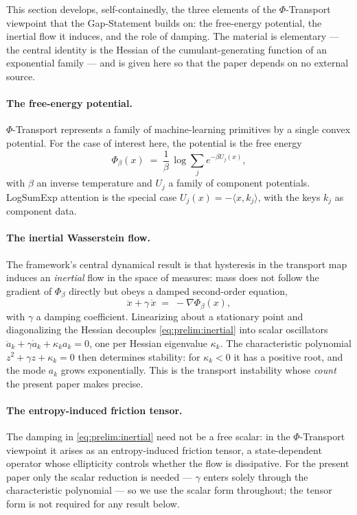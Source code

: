 \documentclass[11pt]{article}
\theoremstyle{plain}
\theoremstyle{definition}
\begin{document}
This section develops, self-containedly, the three elements of the
$\Phi$-Transport viewpoint that the Gap-Statement builds on: the
free-energy potential, the inertial flow it induces, and the role of
damping. The material is elementary --- the central identity is the
Hessian of the cumulant-generating function of an exponential family ---
and is given here so that the paper depends on no external source.

\paragraph{The free-energy potential.}
\label{sec:prelim:phi}
$\Phi$-Transport represents a family of machine-learning primitives by a
single convex potential. For the case of interest here, the potential is
the free energy
\begin{equation}
  \Phi_\beta(x) \;=\; \frac1\beta\,\log\sum_j e^{-\beta U_j(x)},
  \label{eq:prelim:phi}
\end{equation}
with $\beta$ an inverse temperature and $U_j$ a family of component
potentials. LogSumExp attention is the special case
$U_j(x)=-\langle x,k_j\rangle$, with the keys $k_j$ as component data.

\paragraph{The inertial Wasserstein flow.}
\label{sec:inertial}
The framework's central dynamical result is that hysteresis in the
transport map induces an \emph{inertial} flow in the space of measures:
mass does not follow the gradient of $\Phi_\beta$ directly but obeys a
damped second-order equation,
\begin{equation}
  \ddot x + \gamma\,\dot x \;=\; -\nabla\Phi_\beta(x),
  \label{eq:prelim:inertial}
\end{equation}
with $\gamma$ a damping coefficient. Linearizing about a stationary point
and diagonalizing the Hessian decouples \eqref{eq:prelim:inertial} into
scalar oscillators $\ddot a_k+\gamma\dot a_k+\kappa_k a_k=0$, one per
Hessian eigenvalue $\kappa_k$. The characteristic polynomial
$z^2+\gamma z+\kappa_k=0$ then determines stability: for $\kappa_k<0$ it
has a positive root, and the mode $a_k$ grows exponentially. This is the
transport instability whose \emph{count} the present paper makes precise.

\paragraph{The entropy-induced friction tensor.}
\label{sec:friction}
The damping in \eqref{eq:prelim:inertial} need not be a free scalar: in
the $\Phi$-Transport viewpoint it arises as an entropy-induced friction
tensor, a state-dependent operator whose ellipticity controls whether the
flow is dissipative. For the present paper only the scalar reduction is
needed --- $\gamma$ enters solely through the characteristic polynomial ---
so we use the scalar form throughout; the tensor form is not required for
any result below.
\end{document}
